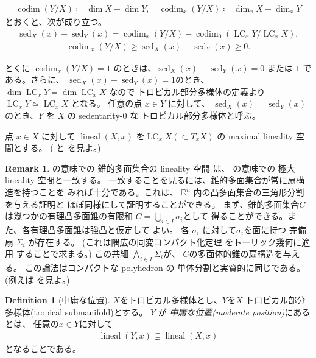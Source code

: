 \documentclass[a4paper,dvipdfmx,reqno,12pt]{amsart}
\theoremstyle{definition}
\newtheorem{definition}[theorem]{Definition}
\newtheorem{remark}[theorem]{Remark}
\newcommand{\deq}{\coloneqq}
\newcommand{\opn}[1]{\operatorname{#1}}
\numberwithin{equation}{section}
\begin{document}
\begin{align}
\opn{codim}(Y/X)\deq \dim X -\dim Y,\quad 
\opn{codim}_x(Y/X)\deq \dim_x X -\dim_x Y
\end{align}
とおくと、次が成り立つ。
\begin{align}
\opn{sed}_X(x)-\opn{sed}_Y(x)=
\opn{codim}_x(Y/X)-\opn{codim}_0(\opn{LC}_x Y/\opn{LC}_xX),
\end{align}
\begin{align}
\opn{codim}_x(Y/X) \geq 
\opn{sed}_X(x)-\opn{sed}_Y(x)\geq 0.
\end{align}

とくに $\opn{codim}_x(Y/X)=1$
のときは、$\opn{sed}_X(x)-\opn{sed}_Y(x)=0$ または
$1$ である。さらに、
$\opn{sed}_X(x)-\opn{sed}_Y(x)=1$のとき、
$\dim \opn{LC}_x Y=\dim \opn{LC}_x X$
なので トロピカル部分多様体の定義より
$\opn{LC}_x Y\simeq \opn{LC}_x X$
となる。
任意の点 $x\in Y$ に対して、
$\opn{sed}_X(x)=\opn{sed}_Y(x)$ 
のとき、$Y$ を $X$ の sedentarity-0 な
トロピカル部分多様体と呼ぶ。 

点 $x\in X$ に対して
$\opn{lineal}(X,x)$ を$\opn{LC}_x X (\subset T_x X)$
の maximal lineality 空間とする。
(\cite[]{MR4246795} と
\cite[]{demedrano2023chern} を見よ。)



\begin{remark}
\cite[]{MR3041763}の意味での
錐的多面集合の lineality 空間
は、
\cite[]{MR4246795}の意味での
極大 lineality 空間と一致する。
一致することを見るには、錐的多面集合が常に扇構造を持つことを
みれば十分である。これは、
$\mathbb{R}^{n}$ 内の凸多面集合の三角形分割を与える証明と
ほぼ同様にして証明することができる。
まず、錐的多面集合$C$は幾つかの有理凸多面錐の有限和
$C=\bigcup_{i\in I}\sigma_i$として
得ることができる。また、各有理凸多面錐は強凸と仮定して
よい。
各 $\sigma_i$ に対して$\sigma_i$を面に持つ
完備扇 $\Sigma_i$ が存在する。
(これは隅広の同変コンパクト化定理
\cite[Theorem 3]{MR337963}をトーリック幾何に適用
することで求まる。)
この共細 $\bigwedge_{i\in I}\Sigma_i$が、
$C$の多面体的錐の扇構造を与える。
この論法はコンパクトな polyhedron の
単体分割と実質的に同じである。
(例えば\cite[Theorem 2.11]{MR665919}
を見よ。)
\end{remark}

\begin{definition}[{中庸な位置}]
\label{definition-permissible-position}
$X$をトロピカル多様体とし、$Y$を$X$
トロピカル部分多様体(tropical submanifold)とする。
$Y$ が \emph{中庸な位置(moderate position)}にあるとは、
任意の$x\in Y$に対して
\begin{align}
     \opn{lineal}(Y,x) \subsetneq
 \opn{lineal}(X,x)
\end{align}
となることである。
\end{definition}
\end{document}
